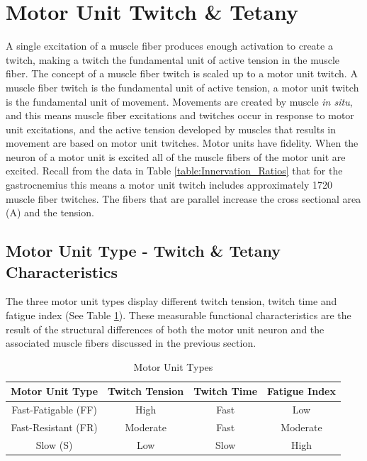 \section{Motor Unit Twitch \& Tetany}

A single excitation of a muscle fiber produces enough activation to create a twitch, making a twitch the fundamental unit of active tension in the muscle fiber. The concept of a muscle fiber twitch is scaled up to a motor unit twitch. A muscle fiber twitch is the fundamental unit of active tension, a motor unit twitch is the fundamental unit of movement.\footnotemark{} Movements are created by muscle \textit{in situ}, and this means muscle fiber excitations and twitches occur in response to motor unit excitations, and the active tension developed by muscles that results in movement are based on motor unit twitches. Motor units have fidelity. When the neuron of a motor unit is excited all of the muscle fibers of the motor unit are excited. Recall from the data in Table \ref{table:Innervation_Ratios} that for the gastrocnemius this means a motor unit twitch includes approximately 1720 muscle fiber twitches. The fibers that are parallel increase the cross sectional area (A) and the tension.

\subsection{Motor Unit Type - Twitch \& Tetany Characteristics}

The three motor unit types display different twitch tension, twitch time and fatigue index (See Table \ref{table:Motor_Unit_Types}). These measurable functional characteristics are the result of the structural differences of both the motor unit neuron and the associated muscle fibers discussed in the previous section.

\begin{table}[h!]
\centering
\begin{tabular}{||c c c c||} 
 \hline
 Motor Unit Type & Twitch Tension & Twitch Time & Fatigue Index \\ [0.5ex] 
 \hline\hline
 Fast-Fatigable (FF)  & High & Fast & Low \\ 
 Fast-Resistant (FR)  & Moderate & Fast & Moderate \\
 Slow (S) &  Low & Slow & High \\ [1ex] 
 \hline
\end{tabular}
\caption{Motor Unit Types}
\label{table:Motor_Unit_Types}
\end{table}

